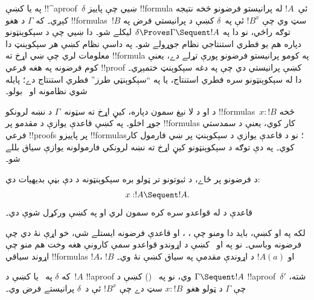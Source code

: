 \documentclass[../../../include/open-logic-section]{subfiles}
\begin{document}


په  يا  کښې !!^a{proof}~$\delta$
ښيي چې پاييز !!{formula} ئې~$!A$ له پرانيستو فرضونو څخه
نتيجه کېږي۔ که $\Gamma$ د هغو !!{formula}s~$!B$ سټ وي چې
$!B^x$ ئې په~$\delta$ کښې د پرانيستي فرض په توګه راځي، نو
دا په $\delta \Proves \Gamma
\Sequent !A$ ليکلے شو۔ دا ښيي چې د سېکوېنټونو دپاره هم يو
فطري استنتاجي نظام جوړولے شو۔ په داسې نظام کښې هر سېکوېنټ دا
معلومات لري چې ښي اړخ ته !!{formula} په کومو پرانيستو فرضونو
پورې تړلے دے، يعنې کوم فرضونه په هغه فرعي !!{proof} کښې
پرانيستي دي چې په دغه سېکوېنټ ختمېږي۔ دا له سېکوېنټونو سره
فطري استنتاج، يا په ``سېکوېنټي طرز'' فطري استنتاج دے؛ پايله
شوي نظامونه  او~ بولو۔

د  او  د لا نېغ سمون دپاره، کيڼ اړخ ته
سټونه~$\Gamma$ د نښه لرونکو !!{formula}s~$x:!B$ څخه جوړ
اخلو۔ په  کښې قاعدې يوازې د مقدمو پر !!{formula}s
کار کوي، يعنې د سمدستي فرعي !!{proof}s پر پاييزو
!!{formula}s؛ نو د  قاعدې يوازې د سېکوېنټ پر ښي
فارمول کار کوي۔ په دې توګه د سېکوېنټونو کيڼ اړخ ته نښه لرونکي
فارمولونه يوازې سياق بللے شو۔

د فرضونو پر ځاے، د  ثبوتونو تر ټولو بره سېکوېنټونه
د دې بڼې بديهيات دي:
\[x:!A \Sequent !A.\]
قاعدې د  له قواعدو سره کره سمون لري او په
 کښې ورکړل شوې دي۔



لکه په  او  کښې، بايد دا ومنو چې
\Intro{\lif}، \Intro{\lnot}، \Elim{\lor} او \Elim{\lexists}
قاعدې فرضونه ايستلے شي، خو اړې نۀ دي چې فرضونه وباسي۔ نو په
 او~ کښې د اړوندو قواعدو سمې کارونې هغه
وخت هم منو چې اړوند سياقي !!{formula}s $!A$، $!B$ او
$!A(a)$ د اړوندې مقدمې په سياق کښې نۀ وي۔

\begin{prop}
که $\delta$ په~ يا  کښې د~$!A$
!!a{proof} وي، نو په~ () کښې د
$\Gamma \Sequent !A$ !!a{proof}~$\delta'$ شته، چې
$\Gamma$ د ټولو هغو~$x:!B$ سټ دے چې $!B^x$ ئې د~$\delta$
پرانيستے فرض وي۔
\end{prop}
\end{document}
